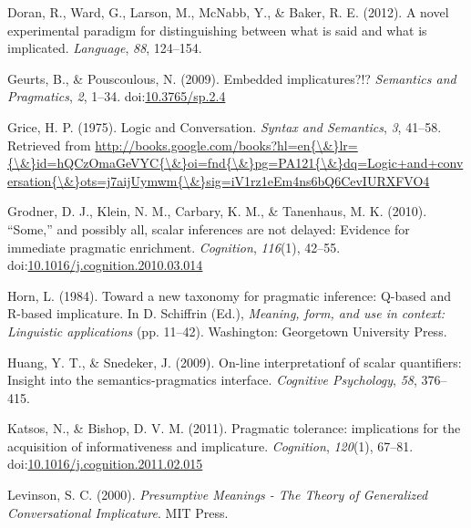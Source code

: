 \documentclass[floatsintext,man]{apa6}
\theoremstyle{definition}
\theoremstyle{definition}
\theoremstyle{definition}
\theoremstyle{remark}
\begin{document}
\hypertarget{ref-Doran2012}{}
Doran, R., Ward, G., Larson, M., McNabb, Y., \& Baker, R. E. (2012). A
novel experimental paradigm for distinguishing between what is said and
what is implicated. \emph{Language}, \emph{88}, 124--154.

\hypertarget{ref-Geurts2009}{}
Geurts, B., \& Pouscoulous, N. (2009). Embedded implicatures?!?
\emph{Semantics and Pragmatics}, \emph{2}, 1--34.
doi:\href{https://doi.org/10.3765/sp.2.4}{10.3765/sp.2.4}

\hypertarget{ref-grice1975}{}
Grice, H. P. (1975). Logic and Conversation. \emph{Syntax and
Semantics}, \emph{3}, 41--58. Retrieved from
\href{http://books.google.com/books?hl=en\%7B/\&\%7Dlr=\%7B/\&\%7Did=hQCzOmaGeVYC\%7B/\&\%7Doi=fnd\%7B/\&\%7Dpg=PA121\%7B/\&\%7Ddq=Logic+and+conversation\%7B/\&\%7Dots=j7aijUymwm\%7B/\&\%7Dsig=iV1rz1eEm4ns6bQ6CevIURXFVO4}{http://books.google.com/books?hl=en\{\textbackslash{}\&\}lr=\{\textbackslash{}\&\}id=hQCzOmaGeVYC\{\textbackslash{}\&\}oi=fnd\{\textbackslash{}\&\}pg=PA121\{\textbackslash{}\&\}dq=Logic+and+conversation\{\textbackslash{}\&\}ots=j7aijUymwm\{\textbackslash{}\&\}sig=iV1rz1eEm4ns6bQ6CevIURXFVO4}

\hypertarget{ref-Grodner2010}{}
Grodner, D. J., Klein, N. M., Carbary, K. M., \& Tanenhaus, M. K.
(2010). ``Some,'' and possibly all, scalar inferences are not delayed:
Evidence for immediate pragmatic enrichment. \emph{Cognition},
\emph{116}(1), 42--55.
doi:\href{https://doi.org/10.1016/j.cognition.2010.03.014}{10.1016/j.cognition.2010.03.014}

\hypertarget{ref-horn1984}{}
Horn, L. (1984). Toward a new taxonomy for pragmatic inference: Q-based
and R-based implicature. In D. Schiffrin (Ed.), \emph{Meaning, form, and
use in context: Linguistic applications} (pp. 11--42). Washington:
Georgetown University Press.

\hypertarget{ref-huang2009}{}
Huang, Y. T., \& Snedeker, J. (2009). On-line interpretationf of scalar
quantifiers: Insight into the semantics-pragmatics interface.
\emph{Cognitive Psychology}, \emph{58}, 376--415.

\hypertarget{ref-Katsos2011}{}
Katsos, N., \& Bishop, D. V. M. (2011). Pragmatic tolerance:
implications for the acquisition of informativeness and implicature.
\emph{Cognition}, \emph{120}(1), 67--81.
doi:\href{https://doi.org/10.1016/j.cognition.2011.02.015}{10.1016/j.cognition.2011.02.015}

\hypertarget{ref-levinson2000}{}
Levinson, S. C. (2000). \emph{Presumptive Meanings - The Theory of
Generalized Conversational Implicature}. MIT Press.
\end{document}
